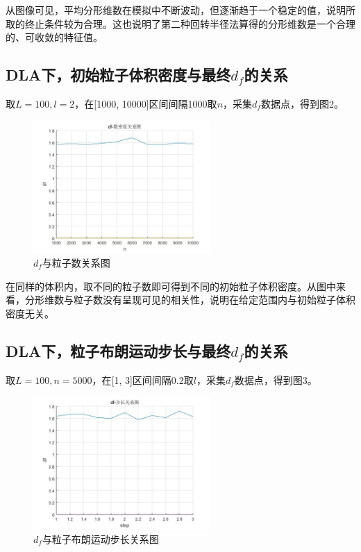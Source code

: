 \documentclass[lang=cn,11pt,a4paper,cite=authoryear]{elegantpaper}
\begin{document}
从图像可见，平均分形维数在模拟中不断波动，但逐渐趋于一个稳定的值，说明所取的终止条件较为合理。这也说明了第二种回转半径法算得的分形维数是一个合理的、可收敛的特征值。

\subsection{DLA下，初始粒子体积密度与最终$d_f$的关系}
取$L= 100, l = 2$，在[1000, 10000]区间间隔1000取$n$，采集$d_f$数据点，得到图2。
\begin{figure}[htbp]
    \centering
    \includegraphics[width=0.6\textwidth]{results/n.png}
    \caption{$d_f$与粒子数关系图}
\end{figure}

在同样的体积内，取不同的粒子数即可得到不同的初始粒子体积密度。从图中来看，分形维数与粒子数没有呈现可见的相关性，说明在给定范围内与初始粒子体积密度无关。

\subsection{DLA下，粒子布朗运动步长与最终$d_f$的关系}
取$L = 100, n = 5000$，在[1, 3]区间间隔0.2取$l$，采集$d_f$数据点，得到图3。
\begin{figure}[htbp]
    \centering
    \includegraphics[width=0.6\textwidth]{results/step.png}
    \caption{$d_f$与粒子布朗运动步长关系图}
\end{figure}
\end{document}
